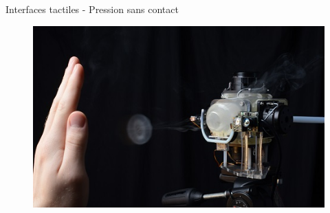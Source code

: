 \documentclass[compress, noflama]{beamer}
\begin{document}
{
\begin{frame}{Interfaces tactiles - Pression sans contact}
\begin{figure}
\href{run:videos/Aireal.mp4}{\includegraphics[width=\linewidth]{images/AIREALVortexRingFig}}
\end{figure}
\end{frame}
}
\end{document}
